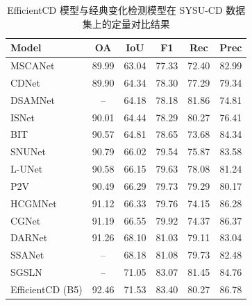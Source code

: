 \begin{table}[!htb]
  \centering
  \caption{EfficientCD 模型与经典变化检测模型在 SYSU-CD 数据集上的定量对比结果}
  \label{tab:efficientcd_sysu}
  \begin{tabular}{lccccc}
    \toprule
    Model          &   OA   &  IoU   &   F1   &   Rec   &  Prec   \\
    \midrule
    MSCANet~\cite{m_liu_cnn-transformer_2022}        &  89.99 &  63.04 &  77.33 &  72.40  &  82.99  \\
    CDNet~\cite{Alcantarilla2016StreetviewCD}          &  89.90 &  64.34 &  78.30 &  77.29  &  79.34  \\
    DSAMNet~\cite{shi_deeply_2022}        &   --   &  64.18 &  78.18 &  81.86  &  74.81  \\
    ISNet~\cite{Cheng2022ISNetTI}          &  90.01 &  64.44 &  78.29 &  80.27  &  76.41  \\
    BIT~\cite{chen_remote_2022}            &  90.57 &  64.81 &  78.65 &  73.68  &  84.34  \\
    SNUNet~\cite{Fang2021SNUNetCDAD}         &  90.79 &  66.02 &  79.54 &  75.87  &  83.58  \\
    L-UNet~\cite{Papadomanolaki2021ADM}         &  90.58 &  66.15 &  79.63 &  78.08  &  81.24  \\
    P2V~\cite{lin_transition_2023}            &  90.49 &  66.29 &  79.73 &  79.29  &  80.17  \\
    HCGMNet~\cite{Han2023HCGMNetAH}        &  91.12 &  66.33 &  79.76 &  74.15  &  86.28  \\
    CGNet~\cite{han_change_2023}          &  91.19 &  66.55 &  79.92 &  74.37  &  86.37  \\
    DARNet~\cite{li_densely_2022}         &  91.26 &  68.10 &  81.03 &  79.11  &  83.04  \\
    SSANet~\cite{Jiang2022JointVL}         &   --   &  68.18 &  81.08 &  79.73  &  82.48  \\
    SGSLN~\cite{zhao_exchanging_2023}          &   --   &  71.05 &  83.07 &  81.45  &  84.76  \\
    EfficientCD (B5)& 92.46 &  71.53 &  83.40 &  80.27  &  86.78  \\
    \bottomrule
  \end{tabular}
\end{table}



